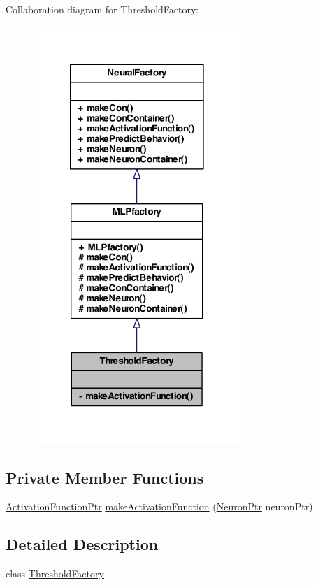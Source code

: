 Collaboration diagram for ThresholdFactory:
\nopagebreak
\begin{figure}[H]
\begin{center}
\leavevmode
\includegraphics[width=222pt]{class_threshold_factory__coll__graph}
\end{center}
\end{figure}
\subsection*{Private Member Functions}
\begin{DoxyCompactItemize}
\item 
\hyperlink{_a_m_o_r_e_8h_a77602a0277a02e5769c3df0adc669b17}{ActivationFunctionPtr} \hyperlink{class_threshold_factory_a6be00aaf355c02f73e1f818d3de8c548}{makeActivationFunction} (\hyperlink{_a_m_o_r_e_8h_ac1ea936c2c7728eb382278131652fef4}{NeuronPtr} neuronPtr)
\end{DoxyCompactItemize}


\subsection{Detailed Description}
class \hyperlink{class_threshold_factory}{ThresholdFactory} -\/ 

